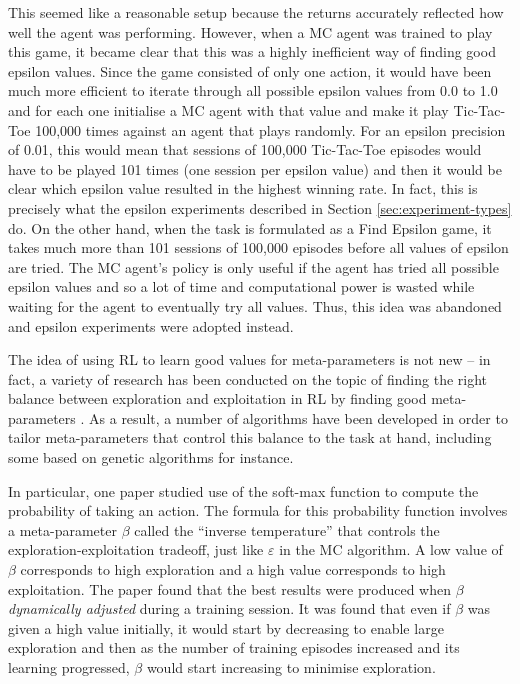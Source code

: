 \documentclass[11pt,a4paper]{report}
\begin{document}
This seemed like a reasonable setup because the returns accurately reflected how well the agent was performing. However, when a MC agent was trained to play this game, it became clear that this was a highly inefficient way of finding good epsilon values. Since the game consisted of only one action, it would have been much more efficient to iterate through all possible epsilon values from 0.0 to 1.0 and for each one initialise a MC agent with that value and make it play Tic-Tac-Toe 100,000 times against an agent that plays randomly. For an epsilon precision of 0.01, this would mean that sessions of 100,000 Tic-Tac-Toe episodes would have to be played 101 times (one session per epsilon value) and then it would be clear which epsilon value resulted in the highest winning rate. In fact, this is precisely what the epsilon experiments described in Section \ref{sec:experiment-types} do. On the other hand, when the task is formulated as a Find Epsilon game, it takes much more than 101 sessions of 100,000 episodes before all values of epsilon are tried. The MC agent's policy is only useful if the agent has tried all possible epsilon values and so a lot of time and computational power is wasted while waiting for the agent to eventually try all values. Thus, this idea was abandoned and epsilon experiments were adopted instead.

The idea of using RL to learn good values for meta-parameters is not new -- in fact, a variety of research has been conducted on the topic of finding the right balance between exploration and exploitation in RL by finding good meta-parameters \cite{meta-optimization} \cite{meta-param-evolution} \cite{exploration-exploitation-meta-param} \cite{meta-learning-rl}. As a result, a number of algorithms have been developed in order to tailor meta-parameters that control this balance to the task at hand, including some based on genetic algorithms \cite{meta-param-evolution} for instance.

In particular, one paper \cite{meta-learning-rl} studied use of the soft-max function to compute the probability of taking an action. The formula for this probability function involves a meta-parameter $\beta$ called the ``inverse temperature'' that controls the exploration-exploitation tradeoff, just like $\varepsilon$ in the MC algorithm. A low value of $\beta$ corresponds to high exploration and a high value corresponds to high exploitation. The paper found that the best results were produced when $\beta$ \emph{dynamically adjusted} during a training session. It was found that even if $\beta$ was given a high value initially, it would start by decreasing to enable large exploration and then as the number of training episodes increased and its learning progressed, $\beta$ would start increasing to minimise exploration.
\end{document}
